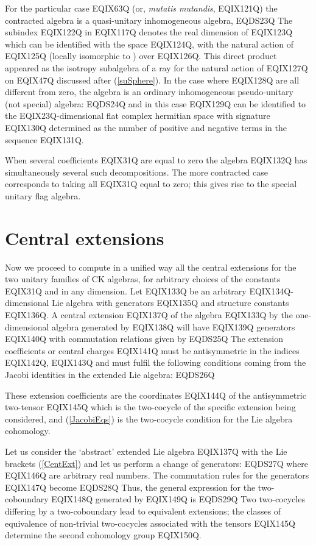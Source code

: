 For the particular case EQIX63Q (or, \emph{mutatis mutandis}, EQIX121Q) the
contracted algebra is a quasi-unitary inhomogeneous algebra,
 EQDS23Q 
The subindex EQIX122Q in EQIX117Q denotes the real dimension of
EQIX123Q which can be identified with the space
EQIX124Q, with the
natural action of  EQIX125Q (locally isomorphic to ) over EQIX126Q. This
direct product appeared as the isotropy subalgebra of a ray for the natural
action of EQIX127Q on EQIX47Q discussed after
(\ref{suSphere}). In the case where
EQIX128Q are all different from zero, the algebra is an
ordinary inhomogeneous pseudo-unitary (not special) algebra:
 EQDS24Q 
and in this case
EQIX129Q can be identified to the
EQIX23Q-dimensional flat complex hermitian space with signature
EQIX130Q determined as the number of positive and negative terms in the sequence
EQIX131Q.

When several coefficients EQIX31Q are equal to zero the algebra
EQIX132Q has simultaneously several such
decompositions. The more contracted case corresponds
to taking all EQIX31Q equal to zero; this gives rise to the  special
unitary flag algebra.

\section{Central extensions}
\label{sec.3}

Now we proceed to compute in a unified way all the central extensions
for the two unitary families of CK algebras, for arbitrary choices of
the constants EQIX31Q and  in any dimension. Let EQIX133Q  be an arbitrary
EQIX134Q-dimensional Lie algebra with generators EQIX135Q and
structure constants
EQIX136Q. A central extension   EQIX137Q of the algebra EQIX133Q
by the one-dimensional algebra generated by
 EQIX138Q will have EQIX139Q generators
EQIX140Q with commutation relations given by
EQDS25Q
The   extension coefficients or  central charges
EQIX141Q  must be antisymmetric in the indices EQIX142Q,
EQIX143Q and must fulfil the following conditions
coming from the Jacobi identities in the extended Lie algebra:
EQDS26Q

These  extension coefficients  are the coordinates
EQIX144Q of the antisymmetric
two-tensor EQIX145Q which is the two-cocycle of the specific extension
being considered, and  (\ref{JacobiEqs}) is
the two-cocycle condition for the Lie algebra cohomology.

Let us consider  the `abstract' extended Lie algebra EQIX137Q
with the  Lie brackets (\ref{CentExt}) and let us perform a change of
generators:
EQDS27Q
where EQIX146Q are arbitrary real
numbers. The commutation rules
for the generators EQIX147Q become
EQDS28Q
Thus, the general expression for the two-coboundary EQIX148Q
generated  by EQIX149Q is
EQDS29Q
Two two-cocycles differing by a two-coboundary lead to equivalent
extensions; the classes of equivalence of non-trivial two-cocycles
associated with the tensors EQIX145Q determine the second cohomology group
EQIX150Q.

